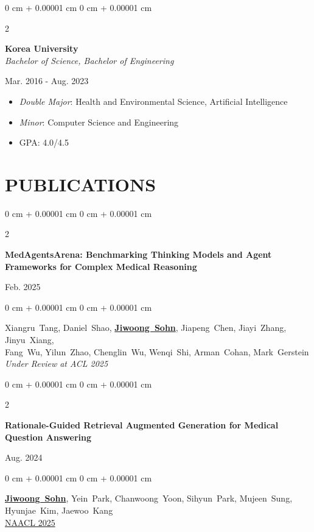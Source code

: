 \documentclass[10pt, letterpaper]{article}
\newenvironment{highlights}{
    \begin{itemize}[
        topsep=0.10 cm,
        parsep=0.10 cm,
        partopsep=0pt,
        itemsep=0pt,
        leftmargin=0 cm + 10pt
    ]
}{
    \end{itemize}
} %
\newenvironment{onecolentry}{
    \begin{adjustwidth}{
        0 cm + 0.00001 cm
    }{
        0 cm + 0.00001 cm
    }
}{
    \end{adjustwidth}
} %
\newenvironment{twocolentry}[2][]{
    \onecolentry
    \def\secondColumn{#2}
    \setcolumnwidth{\fill, 3.5 cm}
    \begin{paracol}{2}
}{
    \switchcolumn \raggedleft \secondColumn
    \end{paracol}
    \endonecolentry
} %
\begin{document}
        \begin{twocolentry}{
            Mar. 2016 - Aug. 2023
        }
            \textbf{Korea University}\\\textit{Bachelor of Science, Bachelor of Engineering}
        \end{twocolentry}

        \begin{highlights}
            
            \item \textit{Double Major}: Health and Environmental Science, Artificial Intelligence
             \\
            \item \textit{Minor}: Computer Science and Engineering
            \item GPA: 4.0/4.5
             \\
        \end{highlights}
    \vspace{0.05 cm}

\section{PUBLICATIONS}
\vspace{0.1 cm}
       \begin{twocolentry}
            {
                Feb. 2025
            }
            {
                \textbf{MedAgentsArena: Benchmarking Thinking Models and Agent Frameworks for Complex Medical Reasoning}
            }
        \end{twocolentry}           
        \begin{onecolentry} 
                \mbox{Xiangru Tang}, \mbox{Daniel Shao}, \mbox{\textbf{\underline{Jiwoong Sohn}}}, \mbox{Jiapeng Chen}, \mbox{Jiayi Zhang}, \mbox{Jinyu Xiang}, \\
                \mbox{Fang Wu}, \mbox{Yilun Zhao}, \mbox{Chenglin Wu}, \mbox{Wenqi Shi}, \mbox{Arman Cohan}, \mbox{Mark Gerstein} \\
                \textit{Under Review at ACL 2025}
        \end{onecolentry}
    \vspace{0.2 cm}

       \begin{twocolentry}
            {
                Aug. 2024
            }
            {
                \textbf{Rationale-Guided Retrieval Augmented Generation for Medical Question Answering}
            }         
        \end{twocolentry}            
        \begin{onecolentry}
                \mbox{\textbf{\underline{Jiwoong Sohn}}}, \mbox{Yein Park},
                \mbox{Chanwoong Yoon}, \mbox{Sihyun Park},
                \mbox{Mujeen Sung}, \mbox{Hyunjae Kim}, \mbox{Jaewoo Kang} \\
        \href{https://arxiv.org/abs/2411.00300} {{NAACL 2025}}   
        \end{onecolentry}
    \vspace{0.2 cm}
\end{document}
